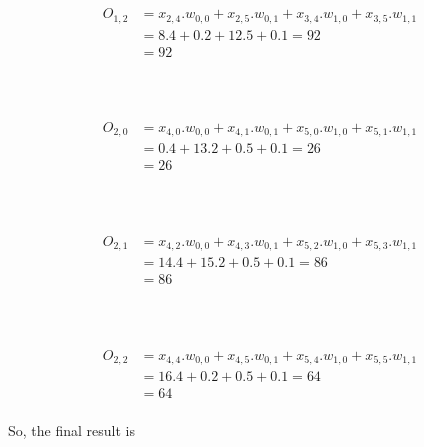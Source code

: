 \\ \\ 
\begin{equation}
    \begin{split}
        O_{1,2} &= x_{2,4}.w_{0,0} + x_{2,5}.w_{0,1} + x_{3,4}.w_{1,0} + x_{3,5}.w_{1,1}\\
        &= 8.4 + 0.2 + 12.5 + 0.1 = 92\\
        &= 92\\
    \end{split}
\end{equation}

\\ \\ 
\begin{equation}
    \begin{split}
        O_{2,0} &= x_{4,0}.w_{0,0} + x_{4,1}.w_{0,1} + x_{5,0}.w_{1,0} + x_{5,1}.w_{1,1}\\
        &= 0.4 + 13.2 + 0.5 + 0.1 = 26\\
        &= 26\\
    \end{split}
\end{equation}

\\ \\
\begin{equation}
    \begin{split}
        O_{2,1} &= x_{4,2}.w_{0,0} + x_{4,3}.w_{0,1} + x_{5,2}.w_{1,0} + x_{5,3}.w_{1,1}\\
        &= 14.4 + 15.2 + 0.5 + 0.1 = 86\\
        &= 86\\
    \end{split}
\end{equation}

\\ \\ 
\begin{equation}
    \begin{split}
        O_{2,2} &= x_{4,4}.w_{0,0} + x_{4,5}.w_{0,1} + x_{5,4}.w_{1,0} + x_{5,5}.w_{1,1}\\
        &= 16.4 + 0.2 + 0.5 + 0.1 = 64\\
        &= 64\\
    \end{split}
\end{equation}

So, the final result is \\ \\

